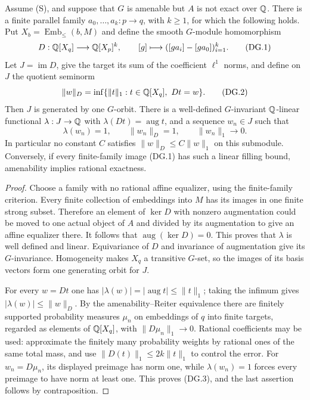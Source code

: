 \begin{proposition}
\label{A:distortion-gate}
Assume (S), and suppose that $G$ is amenable but $A$ is not
exact over $\mathbb Q$. There is a finite parallel family
$a_0,\ldots,a_k:p\to q$, with $k\geq1$, for which the following
holds. Put $X_b=\operatorname{Emb}_{\leq}(b,M)$ and define the
smooth $G$-module homomorphism
\[
 D:\mathbb Q[X_q]\longrightarrow \mathbb Q[X_p]^k,
 \qquad [g]\longmapsto([ga_i]-[ga_0])_{i=1}^k.
 \tag{DG.1}
\]
Let $J=\operatorname{im}D$, give the target its sum of the
coefficient $\ell^1$ norms, and define on $J$ the quotient
seminorm
\[
 \|w\|_D=\inf\{\|t\|_1:t\in\mathbb Q[X_q],\ Dt=w\}.
 \tag{DG.2}
\]
Then $J$ is generated by one $G$-orbit. There is a well-defined
$G$-invariant $\mathbb Q$-linear functional $\lambda:J\to\mathbb Q$ with
$\lambda(Dt)=\operatorname{aug}t$, and a sequence $w_n\in J$ such
that
\[
 \lambda(w_n)=1,\qquad \|w_n\|_D=1,
 \qquad \|w_n\|_1\longrightarrow0.
 \tag{DG.3}
\]
In particular no constant $C$ satisfies
$\|w\|_D\leq C\|w\|_1$ on this submodule. Conversely, if every
finite-family image (DG.1) has such a linear filling bound,
amenability implies rational exactness.
\end{proposition}
\begin{proof}
Choose a family with no rational affine equalizer, using the
finite-family criterion. Every finite collection of embeddings
into $M$ has its images in one finite strong subset. Therefore
an element of $\ker D$ with nonzero augmentation could be moved
to one actual object of $A$ and divided by its augmentation to
give an affine equalizer there. It follows that
$\operatorname{aug}(\ker D)=0$. This proves that $\lambda$ is
well defined and linear. Equivariance of $D$ and invariance of
augmentation give its $G$-invariance. Homogeneity makes $X_q$
a transitive $G$-set, so the images of its basis vectors form
one generating orbit for $J$.

For every $w=Dt$ one has
$|\lambda(w)|=|\operatorname{aug}t|\leq\|t\|_1$;
taking the infimum gives $|\lambda(w)|\leq\|w\|_D$.
By the amenability--Reiter equivalence there are finitely
supported probability measures $\mu_n$ on embeddings of $q$
into finite targets, regarded as elements of $\mathbb Q[X_q]$, with
$\|D\mu_n\|_1\to0$. Rational coefficients may be used:
approximate the finitely many probability weights by rational
ones of the same total mass, and use
$\|D(t)\|_1\leq2k\|t\|_1$ to control the error.
For $w_n=D\mu_n$, its displayed preimage has norm one, while
$\lambda(w_n)=1$ forces every preimage to have norm at least
one. This proves (DG.3), and the last assertion follows by
contraposition.
\end{proof}

